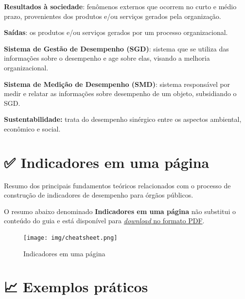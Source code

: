\documentclass[
  letterpaper,
  DIV=11,
  numbers=noendperiod]{scrreprt}
\begin{document}
\textbf{Resultados à sociedade}: fenômenos externos que ocorrem no curto
e médio prazo, provenientes dos produtos e/ou serviços gerados pela
organização.

\textbf{Saídas}: os produtos e/ou serviços gerados por um processo
organizacional.

\textbf{Sistema de Gestão de Desempenho (SGD)}: sistema que se utiliza
das informações sobre o desempenho e age sobre elas, visando a melhoria
organizacional.

\textbf{Sistema de Medição de Desempenho (SMD)}: sistema responsável por
medir e relatar as informações sobre desempenho de um objeto,
subsidiando o SGD.

\textbf{Sustentabilidade:} trata do desempenho sinérgico entre os
aspectos ambiental, econômico e social.


\hypertarget{indicadores-em-uma-puxe1gina}{%
\chapter*{✅ Indicadores em uma
página}\label{indicadores-em-uma-puxe1gina}}


{Resumo dos principais fundamentos teóricos relacionados com o processo
de construção de indicadores de desempenho para órgãos públicos.}

O resumo abaixo denominado {\textbf{Indicadores em uma página}} não
substitui o conteúdo do guia e está disponível para
\href{https://drive.google.com/file/d/1XEPbfm2wZVWjcKBw5oVUntZoBrNMQ55G/view?pli=1}{\emph{download}
no formato PDF}.

\begin{figure}

{\centering \texttt{[image: img/cheatsheet.png]}

}

\caption{Indicadores em uma página}

\end{figure}


\hypertarget{exemplos-pruxe1ticos}{%
\chapter*{📈 Exemplos práticos}\label{exemplos-pruxe1ticos}}
\end{document}
